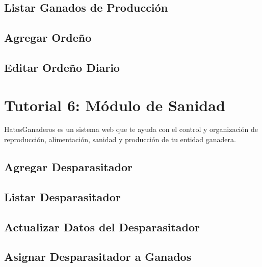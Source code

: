\documentclass[letterpaper,10pt,spanish]{sphinxmanual}
\begin{document}
\subsection{Listar Ganados de Producción}
\label{Tutorial 5: M_xf3dulo de Producci_xf3n:listar-ganados-de-produccion}

\subsection{Agregar Ordeño}
\label{Tutorial 5: M_xf3dulo de Producci_xf3n:agregar-ordeno}

\subsection{Editar Ordeño Diario}
\label{Tutorial 5: M_xf3dulo de Producci_xf3n:editar-ordeno-diario}

\section{Tutorial 6: Módulo de Sanidad}
\label{Tutorial 6: M_xf3dulo de Sanidad:tutorial-6-modulo-de-sanidad}\label{Tutorial 6: M_xf3dulo de Sanidad::doc}
HatosGanaderos es un sistema web que te ayuda con el control y organización de reproducción, alimentación, sanidad y producción de tu entidad ganadera.


\subsection{Agregar Desparasitador}
\label{Tutorial 6: M_xf3dulo de Sanidad:agregar-desparasitador}

\subsection{Listar Desparasitador}
\label{Tutorial 6: M_xf3dulo de Sanidad:listar-desparasitador}

\subsection{Actualizar Datos del Desparasitador}
\label{Tutorial 6: M_xf3dulo de Sanidad:actualizar-datos-del-desparasitador}

\subsection{Asignar Desparasitador a Ganados}
\label{Tutorial 6: M_xf3dulo de Sanidad:asignar-desparasitador-a-ganados}
\end{document}

